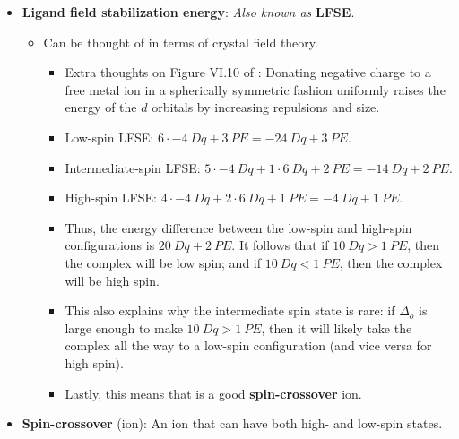 \documentclass[../notes.tex]{subfiles}
\begin{document}
\begin{itemize}
    \item \textbf{Ligand field stabilization energy}: \emph{Also known as} \textbf{LFSE}.
    \begin{itemize}
        \item Can be thought of in terms of crystal field theory.
        \begin{itemize}
            \item Extra thoughts on Figure VI.10 of \textcite{bib:CHEM20100Notes}: Donating negative charge to a free metal ion in a spherically symmetric fashion uniformly raises the energy of the $d$ orbitals by increasing repulsions and size.
            \item Low-spin LFSE: $6\cdot\SI{-4}{Dq}+\SI{3}{PE}=\SI{-24}{Dq}+\SI{3}{PE}$.
            \item Intermediate-spin LFSE: $5\cdot\SI{-4}{Dq}+1\cdot\SI{6}{Dq}+\SI{2}{PE}=\SI{-14}{Dq}+\SI{2}{PE}$.
            \item High-spin LFSE: $4\cdot\SI{-4}{Dq}+2\cdot\SI{6}{Dq}+\SI{1}{PE}=\SI{-4}{Dq}+\SI{1}{PE}$.
            \item Thus, the energy difference between the low-spin and high-spin configurations is $\SI{20}{Dq}+\SI{2}{PE}$. It follows that if $\SI{10}{Dq}>\SI{1}{PE}$, then the complex will be low spin; and if $\SI{10}{Dq}<\SI{1}{PE}$, then the complex will be high spin.
            \item This also explains why the intermediate spin state is rare: if $\Delta_o$ is large enough to make $\SI{10}{Dq}>\SI{1}{PE}$, then it will likely take the complex all the way to a low-spin configuration (and vice versa for high spin).
            \item Lastly, this means that  is a good \textbf{spin-crossover} ion.
        \end{itemize}
    \end{itemize}
    \item \textbf{Spin-crossover} (ion): An ion that can have both high- and low-spin states.
    \begin{figure}[h!]
        \centering
\end{figure}
\end{itemize}
\end{document}
